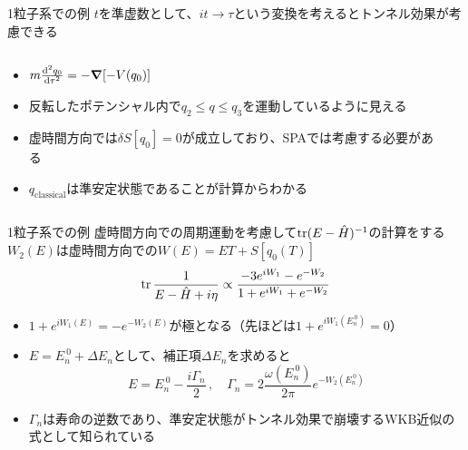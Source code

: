 \documentclass[14pt,aspectratio=169,xcolor=dvipsnames,table,dvipdfmx]{beamer}
\theoremstyle{definition}
\begin{document}
\begin{frame}{1粒子系での例}
  $t$を準虚数として、$it\to\tau$という変換を考えるとトンネル効果が考慮できる
  \begin{columns}[t]
    \begin{column}{.5\textwidth}
      \begin{itemize}
        \item $m\dv[2]{q_0}{\tau} = -\grad \qty[-V(q_0)]$
        \item 反転したポテンシャル内で$q_2\leq q\leq q_3$を運動しているように見える
        \item 虚時間方向では$\delta S[q_0]=0$が成立しており、SPAでは考慮する必要がある
        \item $q_{\text{classical}}$は準安定状態であることが計算からわかる
      \end{itemize}
    \end{column}
    \begin{column}{.5\textwidth}
    \end{column}
  \end{columns}
\end{frame}

\begin{frame}{1粒子系での例}
  虚時間方向での周期運動を考慮して$\trace(E-\hat{H})^{-1}$の計算をする\\
  $W_2(E)$は虚時間方向での$W(E)=ET+S[q_0(T)]$
  \begin{equation*}
    \trace\frac{1}{E-\hat{H}+i\eta} \propto \frac{-3e^{iW_1}-e^{-W_2}}{1+e^{iW_1}+e^{-W_2}}
  \end{equation*}
  \begin{itemize}
    \item $1+e^{iW_1(E)}=-e^{-W_2(E)}$が極となる（先ほどは$1+e^{iW_1(E_n^{~0})}=0$）
    \item $E=E_{n}^{~0}+\varDelta E_n$として、補正項$\varDelta E_n$を求めると
          \begin{equation*}
            E = E_{n}^{~0} -\frac{i\Gamma_n}{2}\,,\quad \Gamma_n = 2\frac{\omega(E_n^{~0})}{2\pi}e^{-W_2(E_n^{~0})}
          \end{equation*}
    \item $\Gamma_n$は寿命の逆数であり、準安定状態がトンネル効果で崩壊するWKB近似の式として知られている
  \end{itemize}
\end{frame}
\end{document}
